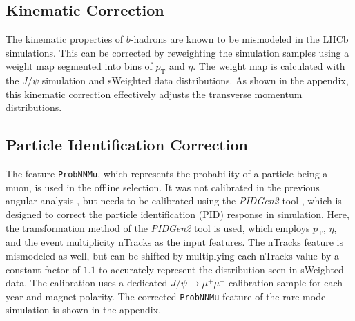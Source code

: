 \subsection{Kinematic Correction}
\label{sec:run2_kinematic_corrections}
The kinematic properties of $b$-hadrons are known to be mismodeled in the LHCb simulations. This can be corrected by reweighting the simulation samples using a weight map segmented into bins of $p_{\text{T}}$ and $\eta$. The weight map is calculated with the $J/\psi$ simulation and sWeighted data distributions. As shown in the appendix, this kinematic correction effectively adjusts the transverse momentum distributions.

\subsection{Particle Identification Correction}
\label{sec:run2_pid_correction}
The feature \texttt{ProbNNMu}, which represents the probability of a particle being a muon, is used in the offline selection. It was not calibrated in the previous angular analysis \cite{Janina}, but needs to be calibrated using the \textit{PIDGen2} tool \cite{pidgen2}, which is designed to correct the particle identification (PID) response in simulation. Here, the transformation method of the \textit{PIDGen2} tool is used, which employs $p_{\text{T}}$, $\eta$, and the event multiplicity nTracks as the input features. The nTracks feature is mismodeled as well, but can be shifted by multiplying each nTracks value by a constant factor of $1.1$ to accurately represent the distribution seen in sWeighted data. The calibration uses a dedicated $J/\psi \to \mu^+ \mu^-$  calibration sample for each year and magnet polarity. The corrected \texttt{ProbNNMu} feature of the rare mode simulation is shown in the appendix.

